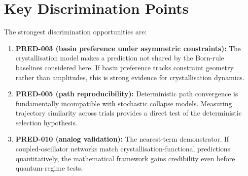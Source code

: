 \documentclass[12pt]{article}
\begin{document}
\section{Key Discrimination Points}

The strongest discrimination opportunities are:

\begin{enumerate}
    \item \textbf{PRED-003 (basin preference under asymmetric constraints):} The crystallisation model makes a prediction not shared by the Born-rule baselines considered here. If basin preference tracks constraint geometry rather than amplitudes, this is strong evidence for crystallisation dynamics.

    \item \textbf{PRED-005 (path reproducibility):} Deterministic path convergence is fundamentally incompatible with stochastic collapse models. Measuring trajectory similarity across trials provides a direct test of the deterministic selection hypothesis.

    \item \textbf{PRED-010 (analog validation):} The nearest-term demonstrator. If coupled-oscillator networks match crystallisation-functional predictions quantitatively, the mathematical framework gains credibility even before quantum-regime tests.
\end{enumerate}



\end{document}
